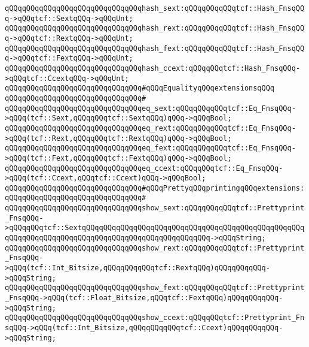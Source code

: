 \verb|qQQqqQQqqQQqqQQqqQQqqQQqqQQqqQQqhash_sext:qQQqqQQqqQQqtcf::Hash_FnsqQQq->qQQqtcf::SextqQQq->qQQqUnt;|\newline
\verb|qQQqqQQqqQQqqQQqqQQqqQQqqQQqqQQqhash_rext:qQQqqQQqqQQqtcf::Hash_FnsqQQq->qQQqtcf::RextqQQq->qQQqUnt;|\newline
\verb|qQQqqQQqqQQqqQQqqQQqqQQqqQQqqQQqhash_fext:qQQqqQQqqQQqtcf::Hash_FnsqQQq->qQQqtcf::FextqQQq->qQQqUnt;|\newline
\verb|qQQqqQQqqQQqqQQqqQQqqQQqqQQqqQQqhash_ccext:qQQqqQQqtcf::Hash_FnsqQQq->qQQqtcf::CcextqQQq->qQQqUnt;|\newline
\newline
\verb|qQQqqQQqqQQqqQQqqQQqqQQqqQQqqQQq#qQQqEqualityqQQqextensionsqQQq|\newline
\verb|qQQqqQQqqQQqqQQqqQQqqQQqqQQqqQQq#|\newline
\verb|qQQqqQQqqQQqqQQqqQQqqQQqqQQqqQQqeq_sext:qQQqqQQqqQQqtcf::Eq_FnsqQQq->qQQq(tcf::Sext,qQQqqQQqtcf::SextqQQq)qQQq->qQQqBool;|\newline
\verb|qQQqqQQqqQQqqQQqqQQqqQQqqQQqqQQqeq_rext:qQQqqQQqqQQqtcf::Eq_FnsqQQq->qQQq(tcf::Rext,qQQqqQQqtcf::RextqQQq)qQQq->qQQqBool;|\newline
\verb|qQQqqQQqqQQqqQQqqQQqqQQqqQQqqQQqeq_fext:qQQqqQQqqQQqtcf::Eq_FnsqQQq->qQQq(tcf::Fext,qQQqqQQqtcf::FextqQQq)qQQq->qQQqBool;|\newline
\verb|qQQqqQQqqQQqqQQqqQQqqQQqqQQqqQQqeq_ccext:qQQqqQQqtcf::Eq_FnsqQQq->qQQq(tcf::Ccext,qQQqtcf::Ccext)qQQq->qQQqBool;|\newline
\newline
\verb|qQQqqQQqqQQqqQQqqQQqqQQqqQQqqQQq#qQQqPrettyqQQqprintingqQQqextensions:|\newline
\verb|qQQqqQQqqQQqqQQqqQQqqQQqqQQqqQQq#|\newline
\verb|qQQqqQQqqQQqqQQqqQQqqQQqqQQqqQQqshow_sext:qQQqqQQqqQQqtcf::Prettyprint_FnsqQQq->qQQqqQQqtcf::SextqQQqqQQqqQQqqQQqqQQqqQQqqQQqqQQqqQQqqQQqqQQqqQQqqQQqqQQqqQQqqQQqqQQqqQQqqQQqqQQqqQQqqQQqqQQqqQQqqQQq->qQQqString;|\newline
\verb|qQQqqQQqqQQqqQQqqQQqqQQqqQQqqQQqshow_rext:qQQqqQQqqQQqtcf::Prettyprint_FnsqQQq->qQQq(tcf::Int_Bitsize,qQQqqQQqqQQqtcf::RextqQQq)qQQqqQQqqQQq->qQQqString;|\newline
\verb|qQQqqQQqqQQqqQQqqQQqqQQqqQQqqQQqshow_fext:qQQqqQQqqQQqtcf::Prettyprint_FnsqQQq->qQQq(tcf::Float_Bitsize,qQQqtcf::FextqQQq)qQQqqQQqqQQq->qQQqString;|\newline
\verb|qQQqqQQqqQQqqQQqqQQqqQQqqQQqqQQqshow_ccext:qQQqqQQqtcf::Prettyprint_FnsqQQq->qQQq(tcf::Int_Bitsize,qQQqqQQqqQQqtcf::Ccext)qQQqqQQqqQQq->qQQqString;|\newline
